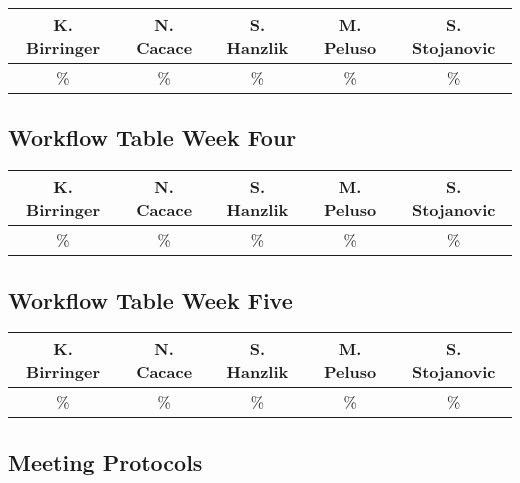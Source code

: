 \documentclass[a4paper, 12pt]{article}
\begin{document}
\begin{table}[h]
\centering
\setlength{\tabcolsep}{12pt}
\begin{tabular}{|c|c|c|c|c|}
\hline
K. Birringer & N. Cacace & S. Hanzlik & M. Peluso & S. Stojanovic\\
\hline
\% & \% & \% & \% & \% \\ 
\hline
\end{tabular}
\end{table}
\newpage
\subsection{Workflow Table Week Four}

\begin{table}[h]
\centering
\setlength{\tabcolsep}{12pt}
\begin{tabular}{|c|c|c|c|c|}
\hline
K. Birringer & N. Cacace & S. Hanzlik & M. Peluso & S. Stojanovic\\
\hline
\% & \% & \% & \% & \% \\ 
\hline
\end{tabular}
\end{table}
\subsection{Workflow Table Week Five}

\begin{table}[h]
\centering
\setlength{\tabcolsep}{12pt}
\begin{tabular}{|c|c|c|c|c|}
\hline
K. Birringer & N. Cacace & S. Hanzlik & M. Peluso & S. Stojanovic\\
\hline
\% & \% & \% & \% & \% \\ 
\hline
\end{tabular}
\end{table}
\subsection{Meeting Protocols}
\end{document}
